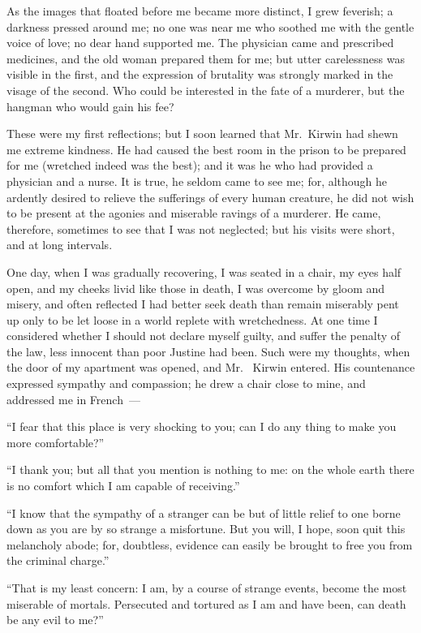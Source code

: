 As the images that floated before me
became more distinct, I grew feverish;
a darkness pressed around me; no one
was near me who soothed me with the
gentle voice of love; no dear hand supported
me. The physician came and
prescribed medicines, and the old woman
prepared them for me; but utter
carelessness was visible in the first, and
the expression of brutality was strongly
marked in the visage of the second.
Who could be interested in the fate of
a murderer, but the hangman who
would gain his fee?

These were my first reflections; but
I soon learned that Mr.~Kirwin had
shewn me extreme kindness. He had
caused the best room in the prison to
be prepared for me (wretched indeed
was the best); and it was he who had
provided a physician and a nurse. It
is true, he seldom came to see me; for,
although he ardently desired to relieve
the sufferings of every human creature,
he did not wish to be present at the
agonies and miserable ravings of a
murderer. He came, therefore, sometimes
to see that I was not neglected;
but his visits were short, and at long
intervals.

One day, when I was gradually recovering,
I was seated in a chair, my
eyes half open, and my cheeks livid
like those in death, I was overcome by
gloom and misery, and often reflected
I had better seek death than remain
miserably pent up only to be let loose
in a world replete with wretchedness.
At one time I considered whether I
should not declare myself guilty, and
suffer the penalty of the law, less innocent
than poor Justine had been. Such
were my thoughts, when the door of
my apartment was opened, and Mr.~%
Kirwin entered. His countenance expressed
sympathy and compassion; he
drew a chair close to mine, and addressed
me in French~---

``I fear that this place is very shocking
to you; can I do any thing to make
you more comfortable?''

``I thank you; but all that you
mention is nothing to me: on the whole
earth there is no comfort which I am
capable of receiving.''

``I know that the sympathy of a
stranger can be but of little relief to
one borne down as you are by so
strange a misfortune. But you will, I
hope, soon quit this melancholy abode;
for, doubtless, evidence can easily be
brought to free you from the criminal
charge.''

``That is my least concern: I am,
by a course of strange events, become
the most miserable of mortals. Persecuted
and tortured as I am and have
been, can death be any evil to me?''

